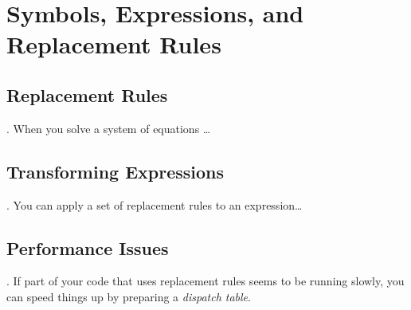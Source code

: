 \chapter{Symbols, Expressions, and Replacement Rules}

\section{Replacement Rules}. When you solve a system of equations \ldots

\section{Transforming Expressions}. You can apply a set of replacement rules to an expression\ldots

\section{Performance Issues}. If part of your code that uses replacement rules seems to be running slowly, you can speed things up by preparing a \emph{dispatch table}.
